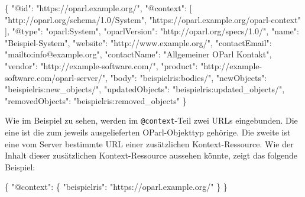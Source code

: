 \documentclass[,a4paper]{article}
\newenvironment{Shaded}{}{}
\newcommand{\DataTypeTok}[1]{\textcolor[rgb]{0.56,0.13,0.00}{{#1}}}
\newcommand{\StringTok}[1]{\textcolor[rgb]{0.25,0.44,0.63}{{#1}}}
\newcommand{\OtherTok}[1]{\textcolor[rgb]{0.00,0.44,0.13}{{#1}}}
\newcommand{\FunctionTok}[1]{\textcolor[rgb]{0.02,0.16,0.49}{{#1}}}
\begin{document}
\begin{Shaded}
\begin{Highlighting}[]
\FunctionTok{\{}
    \DataTypeTok{"@id"}\FunctionTok{:} \StringTok{"https://oparl.example.org/"}\FunctionTok{,}
    \DataTypeTok{"@context"}\FunctionTok{:} \OtherTok{[}
        \StringTok{"http://oparl.org/schema/1.0/System"}\OtherTok{,}
        \StringTok{"https://oparl.example.org/oparl-context"}
    \OtherTok{]}\FunctionTok{,}
    \DataTypeTok{"@type"}\FunctionTok{:} \StringTok{"oparl:System"}\FunctionTok{,}
    \DataTypeTok{"oparlVersion"}\FunctionTok{:} \StringTok{"http://oparl.org/specs/1.0/"}\FunctionTok{,}
    \DataTypeTok{"name"}\FunctionTok{:} \StringTok{"Beispiel-System"}\FunctionTok{,}
    \DataTypeTok{"website"}\FunctionTok{:} \StringTok{"http://www.example.org/"}\FunctionTok{,}
    \DataTypeTok{"contactEmail"}\FunctionTok{:} \StringTok{"mailto:info@example.org"}\FunctionTok{,}
    \DataTypeTok{"contactName"}\FunctionTok{:} \StringTok{"Allgemeiner OParl Kontakt"}\FunctionTok{,}
    \DataTypeTok{"vendor"}\FunctionTok{:} \StringTok{"http://example-software.com/"}\FunctionTok{,}
    \DataTypeTok{"product"}\FunctionTok{:} \StringTok{"http://example-software.com/oparl-server/"}\FunctionTok{,}
    \DataTypeTok{"body"}\FunctionTok{:} \StringTok{"beispielris:bodies/"}\FunctionTok{,}
    \DataTypeTok{"newObjects"}\FunctionTok{:} \StringTok{"beispielris:new_objects/"}\FunctionTok{,}
    \DataTypeTok{"updatedObjects"}\FunctionTok{:} \StringTok{"beispielris:updated_objects/"}\FunctionTok{,}
    \DataTypeTok{"removedObjects"}\FunctionTok{:} \StringTok{"beispielris:removed_objects"}
\FunctionTok{\}}
\end{Highlighting}
\end{Shaded}

Wie im Beispiel zu sehen, werden im \texttt{@context}-Teil zwei URLs
eingebunden. Die eine ist die zum jeweils ausgelieferten OParl-Objekttyp
gehörige. Die zweite ist eine vom Server bestimmte URL einer
zusätzlichen Kontext-Ressource. Wie der Inhalt dieser zusätzlichen
Kontext-Ressource aussehen könnte, zeigt das folgende Beispiel:

\begin{Shaded}
\begin{Highlighting}[]
\FunctionTok{\{}
    \DataTypeTok{"@context"}\FunctionTok{:} \FunctionTok{\{}
        \DataTypeTok{"beispielris"}\FunctionTok{:} \StringTok{"https://oparl.example.org/"}
    \FunctionTok{\}}
\FunctionTok{\}}
\end{Highlighting}
\end{Shaded}
\end{document}
